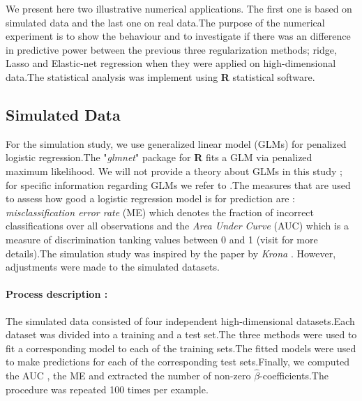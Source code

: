 \documentclass[12pt]{report}
\begin{document}
{\small We present here two illustrative numerical applications. The first one is based on simulated data and the last one on real data.The purpose of the numerical experiment is to show the behaviour and to investigate if there was an difference in predictive power between the previous three regularization methods; ridge, Lasso and Elastic-net regression when they were applied on high-dimensional data.The statistical analysis was implement using \textbf{R} statistical software.
	\subsection{Simulated Data}
	For the simulation study, we use generalized linear model (GLMs) for penalized logistic regression.The "\textit{glmnet}" \cite{nref28} package for \textbf{R} fits a GLM via penalized maximum likelihood. We will not provide a theory about GLMs in this study ; for specific information regarding GLMs we refer to \cite{nref29} .The measures that are used to assess how good a logistic regression model is for prediction are : \textit{misclassification error rate }(ME) which denotes the fraction of incorrect classifications over all observations and the \textit{Area Under Curve} (AUC) which is a measure of discrimination tanking values between 0 and 1 (visit \cite{nref30} for more details).The simulation study was inspired by the paper by \textit{Krona } \cite{nref30}. However, adjustments were made to the simulated datasets.
	\paragraph{Process description :}
	The simulated data consisted of four independent high-dimensional datasets.Each dataset was divided into a training and a test set.The three methods were used to fit a corresponding model to each of the training sets.The fitted models were used to make predictions for each of the corresponding test sets.Finally, we computed the AUC , the ME and extracted the number of non-zero $\hat{\beta}$-coefficients.The procedure was repeated 100 times per example.
}
\end{document}

